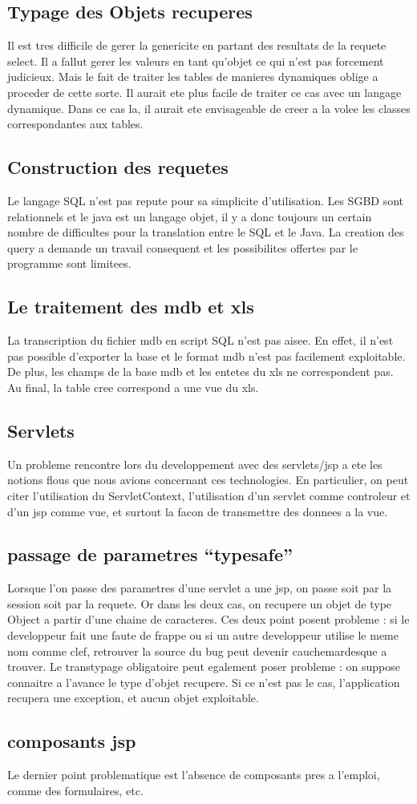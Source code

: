 \subsection{Typage des Objets recuperes}
Il est tres difficile de gerer la genericite en partant des resultats de la requete select. Il a fallut gerer les valeurs en tant qu'objet ce qui n'est pas forcement judicieux. Mais le fait de traiter les tables de manieres dynamiques oblige a proceder de cette sorte. Il aurait ete plus facile de traiter ce cas avec un langage dynamique. Dans ce cas la, il aurait ete envisageable de creer a la volee les classes correspondantes aux tables.
\subsection{Construction des requetes}
Le langage SQL n'est pas repute pour sa simplicite d'utilisation. Les SGBD sont relationnels et le java est un langage objet, il y a donc toujours un certain nombre de difficultes pour la translation entre le SQL et le Java. La creation des query a demande un travail consequent et les possibilites offertes par le programme sont limitees.
\subsection{Le traitement des mdb et xls}
La transcription du fichier mdb en script SQL n'est pas aisee. En effet, il n'est pas possible d'exporter la base et le format mdb n'est pas facilement exploitable. De plus, les champs de la base mdb et les entetes du xls ne correspondent pas. Au final, la table cree correspond a une vue du xls.

\subsection{Servlets}
Un probleme rencontre lors du developpement avec des servlets/jsp a ete les notions flous que nous avions concernant ces technologies. En particulier, on peut citer l'utilisation du ServletContext, l'utilisation d'un servlet comme controleur et d'un jsp comme vue, et surtout la facon de transmettre des donnees a la vue.

\subsection{passage de parametres ``typesafe''}
Lorsque l'on passe des parametres d'une servlet a une jsp, on passe soit par la session soit par la requete. Or dans les deux cas, on recupere un objet de type Object a partir d'une chaine de caracteres. Ces deux point posent probleme : si le developpeur fait une faute de frappe ou si un autre developpeur utilise le meme nom comme clef, retrouver la source du bug peut devenir cauchemardesque a trouver. Le transtypage obligatoire peut egalement poser probleme : on suppose connaitre a l'avance le type d'objet recupere. Si ce n'est pas le cas, l'application recupera une exception, et aucun objet exploitable.

\subsection{composants jsp}
Le dernier point problematique est l'absence de composants pres a l'emploi, comme des formulaires, etc.
